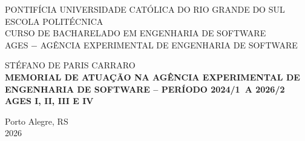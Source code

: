 \author{Stéfano De Paris Carraro}

\def\autor{\uppercase{Stéfano De Paris Carraro}}
\def\inicio{2024/1}
\def\fim{2026/2}
\def\ages{I, II, III e IV}
\def\local{Porto Alegre, RS}
\def\ano{2026}

\begin{capa}
  \centering
    \uppercase{
      PONTIFÍCIA UNIVERSIDADE CATÓLICA DO RIO GRANDE DO SUL\\
      ESCOLA POLITÉCNICA\\
      CURSO DE BACHARELADO EM ENGENHARIA DE SOFTWARE\\
      AGES $-$ AGÊNCIA EXPERIMENTAL DE ENGENHARIA DE SOFTWARE\\
      }

    \vfill
    \autor\\
    \vfill
    \textbf{
      \uppercase{
        Memorial de atuação na Agência Experimental de Engenharia de Software 
        -- Período \inicio\ a \fim\
        \\AGES \ages\
      }
    }
    
    \vfill

    \vfill
    \local\\
    \ano\
  \end{capa}